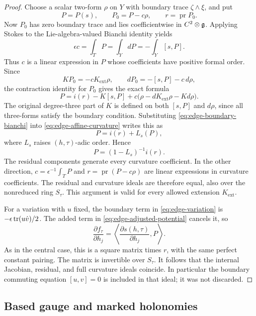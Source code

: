 \begin{proof}
Choose a scalar two-form $\rho$ on $Y$ with boundary trace
$\zeta\wedge\xi$, and put
\[
 P=P(s),\qquad P_0=P-c\rho,\qquad
 r=\operatorname{pr}P_0.
\]
Now $P_0$ has zero boundary trace and lies coefficientwise in $C^2\otimes\mathfrak{g}$.  Applying Stokes
to the Lie-algebra-valued Bianchi identity yields
\begin{equation}
\label{eq:edge-boundary-bianchi}
 \epsilon c=\int_T P=\int_Y dP=-\int_Y[s,P].
\end{equation}
Thus $c$ is a linear expression in $P$ whose coefficients have positive
formal order.  Since
\[
 KP_0=-cK_{\mathrm{ext}}\rho,
 \qquad dP_0=-[s,P]-c\,d\rho,
\]
the contraction identity for $P_0$ gives the exact formula
\begin{equation}
\label{eq:edge-affine-curvature}
 P=i(r)-K[s,P]
       +c\bigl(\rho-dK_{\mathrm{ext}}\rho-Kd\rho\bigr).
\end{equation}
The original degree-three part of $K$ is defined on both $[s,P]$ and
$d\rho$, since all three-forms satisfy the boundary condition.
Substituting \eqref{eq:edge-boundary-bianchi} into
\eqref{eq:edge-affine-curvature} writes this as
\[
 P=i(r)+L_s(P),
\]
where $L_s$ raises $(h,\tau)$-adic order.  Hence
\[
 P=(1-L_s)^{-1}i(r).
\]
The residual components generate every curvature coefficient.  In the
other direction, $c=\epsilon^{-1}\int_TP$ and
$r=\operatorname{pr}(P-c\rho)$ are linear expressions in curvature
coefficients.  The residual and curvature ideals are therefore equal,
also over the nonreduced ring $S_\tau$.  This argument is valid for every
allowed extension $K_{\mathrm{ext}}$.

For a variation with $u$ fixed, the boundary term in
\eqref{eq:edge-variation} is
$-\epsilon\operatorname{tr}(u\dot v)/2$.  The added term in
\eqref{eq:edge-adjusted-potential} cancels it, so
\begin{equation}
\label{eq:edge-fixed-u-gradient}
 \frac{\partial f_\tau}{\partial h_j}
    =\left\langle\frac{\partial s(h,\tau)}{\partial h_j},P\right\rangle.
\end{equation}
As in the central case, this is a square matrix times $r$, with the
same perfect constant pairing.  The matrix is invertible over
$S_\tau$.  It follows that the internal Jacobian, residual, and full
curvature ideals coincide.  In particular the boundary commuting
equation $[u,v]=0$ is included in that ideal; it was not discarded.
\end{proof}

\subsection{Based gauge and marked holonomies}

